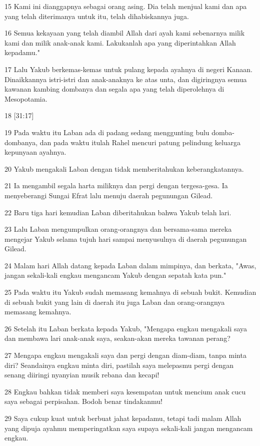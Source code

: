 \par 15 Kami ini dianggapnya sebagai orang asing. Dia telah menjual kami dan apa yang telah diterimanya untuk itu, telah dihabiskannya juga.
\par 16 Semua kekayaan yang telah diambil Allah dari ayah kami sebenarnya milik kami dan milik anak-anak kami. Lakukanlah apa yang diperintahkan Allah kepadamu."
\par 17 Lalu Yakub berkemas-kemas untuk pulang kepada ayahnya di negeri Kanaan. Dinaikkannya istri-istri dan anak-anaknya ke atas unta, dan digiringnya semua kawanan kambing dombanya dan segala apa yang telah diperolehnya di Mesopotamia.
\par 18 [31:17]
\par 19 Pada waktu itu Laban ada di padang sedang menggunting bulu domba-dombanya, dan pada waktu itulah Rahel mencuri patung pelindung keluarga kepunyaan ayahnya.
\par 20 Yakub mengakali Laban dengan tidak memberitahukan keberangkatannya.
\par 21 Ia mengambil segala harta miliknya dan pergi dengan tergesa-gesa. Ia menyeberangi Sungai Efrat lalu menuju daerah pegunungan Gilead.
\par 22 Baru tiga hari kemudian Laban diberitahukan bahwa Yakub telah lari.
\par 23 Lalu Laban mengumpulkan orang-orangnya dan bersama-sama mereka mengejar Yakub selama tujuh hari sampai menyusulnya di daerah pegunungan Gilead.
\par 24 Malam hari Allah datang kepada Laban dalam mimpinya, dan berkata, "Awas, jangan sekali-kali engkau mengancam Yakub dengan sepatah kata pun."
\par 25 Pada waktu itu Yakub sudah memasang kemahnya di sebuah bukit. Kemudian di sebuah bukit yang lain di daerah itu juga Laban dan orang-orangnya memasang kemahnya.
\par 26 Setelah itu Laban berkata kepada Yakub, "Mengapa engkau mengakali saya dan membawa lari anak-anak saya, seakan-akan mereka tawanan perang?
\par 27 Mengapa engkau mengakali saya dan pergi dengan diam-diam, tanpa minta diri? Seandainya engkau minta diri, pastilah saya melepasmu pergi dengan senang diiringi nyanyian musik rebana dan kecapi!
\par 28 Engkau bahkan tidak memberi saya kesempatan untuk mencium anak cucu saya sebagai perpisahan. Bodoh benar tindakanmu!
\par 29 Saya cukup kuat untuk berbuat jahat kepadamu, tetapi tadi malam Allah yang dipuja ayahmu memperingatkan saya supaya sekali-kali jangan mengancam engkau.
